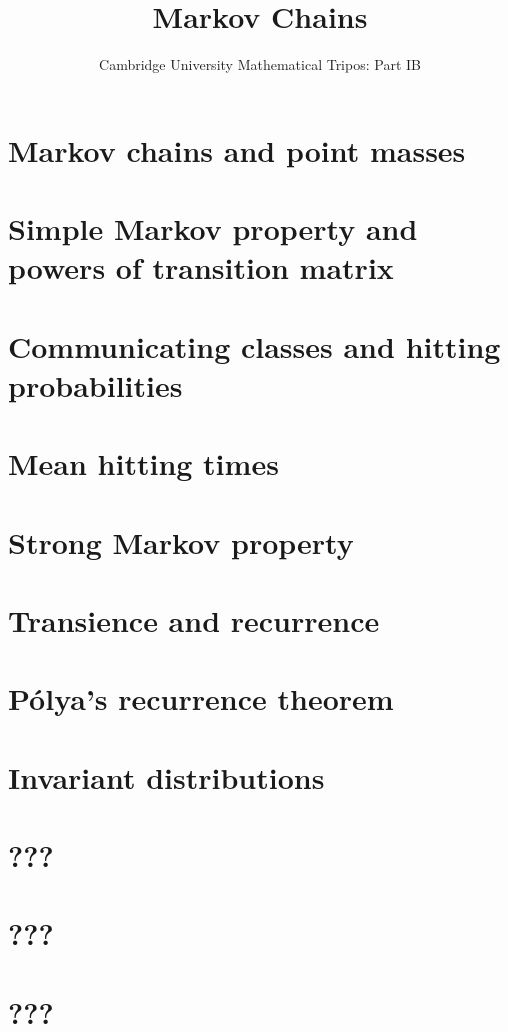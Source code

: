 \documentclass{article}
\title{Markov Chains}
\author{Cambridge University Mathematical Tripos: Part IB}
\begin{document}
\maketitle

\tableofcontentsnewpage{}

\section{Markov chains and point masses}

\section{Simple Markov property and powers of transition matrix}

\section{Communicating classes and hitting probabilities}

\section{Mean hitting times}

\section{Strong Markov property}

\section{Transience and recurrence}

\section{P\'olya's recurrence theorem}

\section{Invariant distributions}

\section{???}

\section{???}

\section{???}

\end{document}
